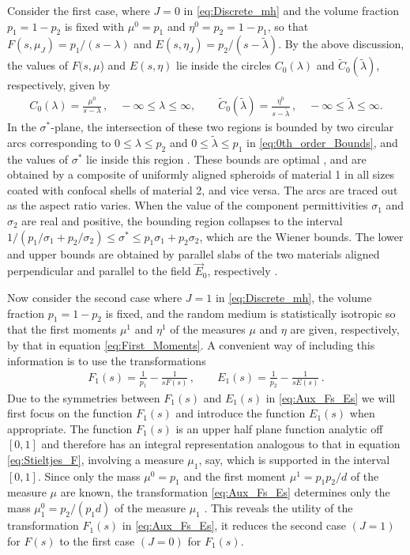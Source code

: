 \documentclass{cmslatex}
\begin{document}
Consider the first case, where $J=0$  in \eqref{eq:Discrete_mh} and the
volume fraction $p_1=1-p_2$ is fixed with $\mu^0=p_1$ and
$\eta^0=p_2=1-p_1$, so that $F(s,\mu_J)=p_1/(s-\lambda)$ and
$E(s,\eta_J)=p_2/(s-\tilde{\lambda})$. By the above discussion, the values of 
$F(s,\mu$) and $E(s,\eta)$ lie inside the circles $C_0(\lambda)$ and
$\tilde{C}_0(\tilde{\lambda})$, respectively, given by  
%
\begin{align}\label{eq:0th_order_Bounds}
    C_0(\lambda)=\frac{\mu^0}{s-\lambda}\,, \quad -\infty\leq\lambda\leq \infty, \qquad
    \tilde{C}_0(\tilde{\lambda})=\frac{\eta^0}{s-\tilde{\lambda}}\,, \quad
    -\infty\leq\tilde{\lambda}\leq \infty. 
\end{align}
%
In the $\sigma^*$-plane, the intersection of these two regions is bounded by
two circular arcs corresponding to $0\leq\lambda\leq p_2$ and $0\leq\tilde{\lambda}\leq p_1$
in \eqref{eq:0th_order_Bounds}, and the values of $\sigma^*$ lie inside
this region \cite{Golden:1986:BCP}. These bounds are optimal
\cite{Milton:JAP-5286,Bergman:AP-78}, and are obtained by a composite
of uniformly aligned spheroids of material 1 in all sizes coated with
confocal shells of material 2, and vice versa. The arcs are traced out
as the aspect ratio varies. When the value of the component
permittivities $\sigma_1$ and $\sigma_2$ are real and positive, the bounding
region collapses to the interval
$1/(p_1/\sigma_1+p_2/\sigma_2)\leq\sigma^*\leq p_1\sigma_1+p_2\sigma_2$, which are the Wiener
bounds. The lower and upper bounds are obtained by parallel slabs of
the two materials aligned perpendicular and parallel to the field
$\vec{E}_0$, respectively \cite{Scaife-1989}.



Now consider the second case where $J=1$ in \eqref{eq:Discrete_mh},
the volume fraction $p_1=1-p_2$ is fixed, and the random medium is
statistically isotropic so that the first moments $\mu^1$ and $\eta^1$ of
the measures $\mu$ and $\eta$ are given, respectively, by that in equation  
\eqref{eq:First_Moments}.  A convenient way of including this
information is to use the transformations \cite{Bergman:AP-78}
%
\begin{align}\label{eq:Aux_Fs_Es}
  F_1(s)=\frac{1}{p_1}-\frac{1}{sF(s)}\,, \qquad
  E_1(s)=\frac{1}{p_2}-\frac{1}{sE(s)}\,.
\end{align}
%
Due to the symmetries between $F_1(s)$ and $E_1(s)$ in
\eqref{eq:Aux_Fs_Es} we will first focus on the function $F_1(s)$ and
introduce the function $E_1(s)$ when appropriate. The function
$F_1(s)$ is an upper half plane function analytic off $[0,1]$ and
therefore has an integral representation
\cite{Bergman:AP-78,Golden:1986:BCP} analogous to that in equation
\eqref{eq:Stieltjes_F}, involving a
measure $\mu_1$, say, which is supported in the interval $[0,1]$. Since
only the mass $\mu^0=p_1$ and the first moment $\mu^1=p_1p_2/d$ of the
measure $\mu$ are known, the transformation \eqref{eq:Aux_Fs_Es}
determines only the mass $\mu_1^0=p_2/(p_1d)$ of the measure $\mu_1$
\cite{Bergman:AP-78,Golden:1986:BCP}. This reveals the utility of the
transformation $F_1(s)$ in \eqref{eq:Aux_Fs_Es}, it reduces the second
case $(J=1)$ for $F(s)$ to the first case $(J=0)$ for $F_1(s)$.
\end{document}
